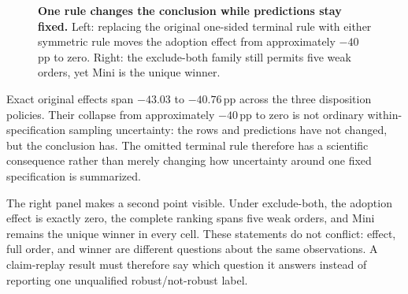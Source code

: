 \documentclass{article}
\newcommand{\pp}{\,pp}
\begin{document}
\begin{figure}[t]
{%
}
\caption{\textbf{One rule changes the conclusion while predictions stay fixed.} Left: replacing the original one-sided terminal rule with either symmetric rule moves the adoption effect from approximately \(-40\)\pp{} to zero. Right: the exclude-both family still permits five weak orders, yet Mini is the unique winner.}
\label{fig:controlled-semantic-main}
\end{figure}
\FloatBarrier

Exact original effects span \(-43.03\) to \(-40.76\)\pp{} across the three disposition policies.  Their collapse from approximately \(-40\)\pp{} to zero is not ordinary within-specification sampling uncertainty: the rows and predictions have not changed, but the conclusion has.  The omitted terminal rule therefore has a scientific consequence rather than merely changing how uncertainty around one fixed specification is summarized.

The right panel makes a second point visible.  Under exclude-both, the adoption effect is exactly zero, the complete ranking spans five weak orders, and Mini remains the unique winner in every cell.  These statements do not conflict: effect, full order, and winner are different questions about the same observations.  A claim-replay result must therefore say which question it answers instead of reporting one unqualified robust/not-robust label.
\end{document}
